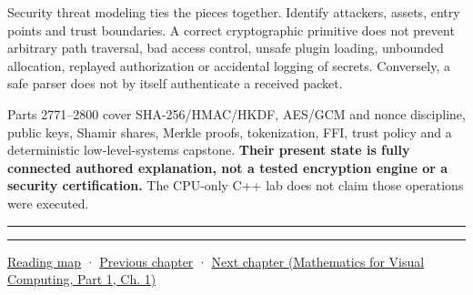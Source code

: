 Security threat modeling ties the pieces together. Identify attackers, assets, entry points and trust boundaries. A correct cryptographic primitive does not prevent arbitrary path traversal, bad access control, unsafe plugin loading, unbounded allocation, replayed authorization or accidental logging of secrets. Conversely, a safe parser does not by itself authenticate a received packet.

Parts 2771--2800 cover SHA-256/HMAC/HKDF, AES/GCM and nonce discipline, public keys, Shamir shares, Merkle proofs, tokenization, FFI, trust policy and a deterministic low-level-systems capstone. \textbf{Their present state is fully connected authored explanation, not a tested encryption engine or a security certification.} The CPU-only C++ lab does not claim those operations were executed.

\begin{center}\rule{0.5\linewidth}{0.5pt}\end{center}

\begin{center}\rule{0.5\linewidth}{0.5pt}\end{center}

\hyperref[volume-reading-map]{Reading map} · \hyperref[01-foundations-i-ch015-execute-and-measure-a-metal-frame]{Previous chapter} · \href{../02-Mathematics-for-Visual-Computing-P01/main.pdf\#01-foundations-i-ch017-python-and-numerical-tools-for-graphics-systems}{Next chapter (Mathematics for Visual Computing, Part 1, Ch. 1)}

